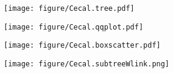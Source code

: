 \documentclass[a4paper]{article}
\begin{document}
\thispagestyle{empty}
\newpage
\captionsetup[subfigure]{position=top, labelfont=bf,labelformat=simple,textfont=normalfont,singlelinecheck=off,justification=raggedright}
\renewcommand{\thesubfigure}{\alph{subfigure}}
\begin{figure}[!ht]
    \centering
    
    \begin{subfigure}{0.66\textwidth}
    \caption{}
    \centering
    \texttt{[image: figure/Cecal.tree.pdf]}
    \end{subfigure}
    \hfill
    \begin{subfigure}{0.33\textwidth}
    \caption{}
    \centering
    \texttt{[image: figure/Cecal.qqplot.pdf]}
    \end{subfigure}
    \hfill
    \begin{subfigure}{0.66\textwidth}
    \caption{}
    \centering
    \texttt{[image: figure/Cecal.boxscatter.pdf]}
    \end{subfigure}
    \hfill
    \begin{subfigure}{0.33\textwidth}
    \caption{}
    \centering
    \texttt{[image: figure/Cecal.subtreeWlink.png]}
    \end{subfigure}
\end{figure}
\thispagestyle{empty}
\end{document}
